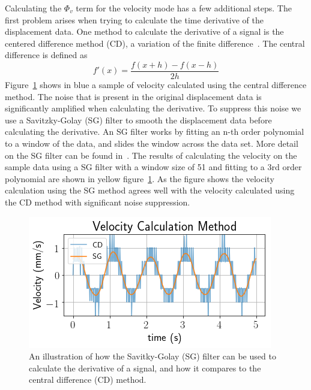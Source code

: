 \documentclass[aps,prstab,reprint,12pt]{revtex4-1}
\begin{document}
Calculating the $\Phi_v$ term for the velocity mode has a few additional steps. The first problem arises when trying to calculate the time derivative of the displacement data. One method to calculate the derivative of a signal is the centered difference method (CD), a variation of the finite difference~\cite{finite_diff}.
The central difference is defined as
\begin{equation}
    f'(x) = \frac{f(x+h)-f(x-h)}{2h}
    \label{eq:diff}
\end{equation}
Figure~\ref{fig:savgol} shows in blue a sample of velocity calculated using the central difference method.
The noise that is present in the original displacement data is significantly amplified when calculating the derivative.
To suppress this noise we use a Savitzky-Golay (SG) filter to smooth the displacement data before calculating the derivative.
An SG filter works by fitting an n-th order polynomial to a window of the data, and slides the window across the data set.
More detail on the SG filter can be found in~\cite{press1990savitzky}.
The results of calculating the velocity on the sample data using a SG filter with a window size of 51 and fitting to a 3rd order polynomial are shown in yellow figure~\ref{fig:savgol}.
As the figure shows the velocity calculation using the SG method agrees well with the velocity calculated using the CD method with significant noise suppression.

\begin{figure}[b]
    \centering
    \includegraphics[width=\linewidth]{figs/data/velocity_savgol.png}
    \caption{An illustration of how the Savitky-Golay (SG) filter can be used to calculate the derivative of a signal, and how it compares to the central difference (CD) method.}
    \label{fig:savgol}
\end{figure}
\end{document}
